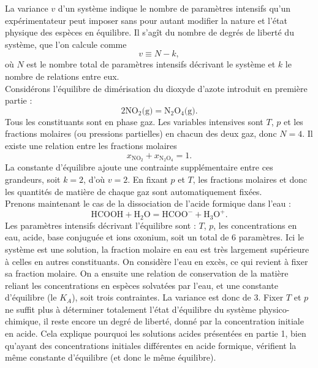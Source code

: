 \documentclass[11pt,a4paper]{report}
\begin{document}
La variance $v$ d'un système indique le nombre de paramètres intensifs qu'un expérimentateur peut imposer sans pour autant modifier la nature et l'état physique des espèces en équilibre. Il s'agît du nombre de degrés de liberté du système, que l'on calcule comme
\begin{equation}
	v \equiv N - k,
\end{equation}
où $N$ est le nombre total de paramètres intensifs décrivant le système et $k$ le nombre de relations entre eux.\\

Considérons l'équilibre de dimérisation du dioxyde d'azote introduit en première partie :
\begin{equation}
	2\text{NO}_2 \text{(g)} = \text{N}_2\text{O}_4 \text{(g)}.
\end{equation}
Tous les constituants sont en phase gaz. Les variables intensives sont $T$, $p$ et les fractions molaires (ou pressions partielles) en chacun des deux gaz, donc $N = 4$. Il existe une relation entre les fractions molaires
\begin{equation}
	x_{\text{NO}_2} + x_{\text{N}_2\text{O}_4} = 1.
\end{equation}
La constante d'équilibre ajoute une contrainte supplémentaire entre ces grandeurs, soit $k = 2$, d'où $v = 2$. En fixant $p$ et $T$, les fractions molaires et donc les quantités de matière de chaque gaz sont automatiquement fixées.\\

Prenons maintenant le cas de la dissociation de l'acide formique dans l'eau :
\begin{equation}
	\text{HCOOH} + \text{H}_2\text{O} = \text{HCOO}^- + \text{H}_3\text{O}^+.
\end{equation}
Les paramètres intensifs décrivant l'équilibre sont : $T$, $p$, les concentrations en eau, acide, base conjuguée et ions oxonium, soit un total de 6 paramètres. Ici le système est une solution, la fraction molaire en eau est très largement supérieure à celles en autres constituants. On considère l'eau en excès, ce qui revient à fixer sa fraction molaire. On a ensuite une relation de conservation de la matière reliant les concentrations en espèces solvatées par l'eau, et une constante d'équilibre (le $K_A$), soit trois contraintes. La variance est donc de 3. Fixer $T$ et $p$ ne suffit plus à déterminer totalement l'état d'équilibre du système physico-chimique, il reste encore un degré de liberté, donné par la concentration initiale en acide. Cela explique pourquoi les solutions acides présentées en partie 1, bien qu'ayant des concentrations initiales différentes en acide formique, vérifient la même constante d'équilibre (et donc le même équilibre).\\
\end{document}
